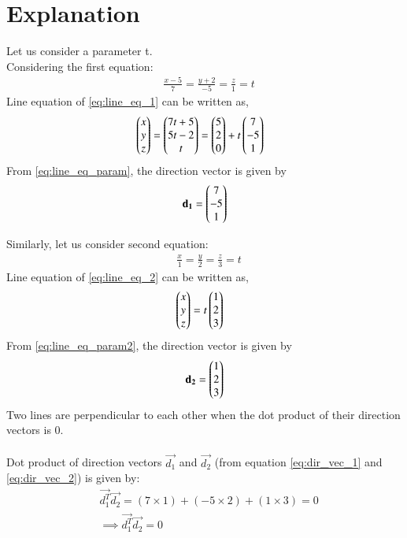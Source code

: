 \documentclass[journal,12pt,twocolumn]{IEEEtran}
\begin{document}
\section{Explanation}
Let us consider a parameter t.\\ Considering the first equation:
 \begin{align}  \label{eq:line_eq_1}
& \frac{x-5}{7} = \frac{y+2}{-5} = \frac{z}{1} = t
\end{align}
Line equation of \eqref{eq:line_eq_1} can be written as,
 \begin{align} \label{eq:line_eq_param}
& \begin{pmatrix}x\\ y\\ z\end{pmatrix} = \begin{pmatrix}7t+5\\ 5t-2\\ t\end{pmatrix} = \begin{pmatrix}5\\ 2\\ 0\end{pmatrix} +t \begin{pmatrix}7\\ -5\\ 1\end{pmatrix}
\end{align}
From \eqref{eq:line_eq_param}, the direction vector is given by 
 \begin{align} \label{eq:dir_vec_1}
\mathbf{d_1} = \begin{pmatrix}7\\ -5\\ 1\end{pmatrix}
 \end{align}

Similarly, let us consider second equation:
 \begin{align} \label{eq:line_eq_2}
& \frac{x}{1} = \frac{y}{2} = \frac{z}{3} = t
\end{align}
Line equation of  \eqref{eq:line_eq_2} can be written as,
 \begin{align} \label{eq:line_eq_param2}
& \begin{pmatrix}x\\ y\\ z\end{pmatrix} = t \begin{pmatrix}1\\ 2\\ 3\end{pmatrix}
\end{align}
From  \eqref{eq:line_eq_param2},  the direction vector is given by 
 \begin{align} \label{eq:dir_vec_2}
\mathbf{d_2} = \begin{pmatrix}1\\ 2\\ 3\end{pmatrix}
 \end{align}
Two lines are perpendicular to each other when the dot product of their direction vectors is 0.\\
\\
Dot product of direction vectors $\vec{d_1}$ and $\vec{d_2}$ (from equation \eqref{eq:dir_vec_1} and \eqref{eq:dir_vec_2}) is given by:\\
 \begin{align}
& \vec{d_1^T}\vec{d_2}= (7 \times 1) + (-5 \times 2) + (1 \times 3) = 0   \label{eq:dotproduct}\\
& \implies \boxed{\vec{d_1^T}\vec{d_2} = 0}  \label{eq:res}
\end{align}
\end{document}
